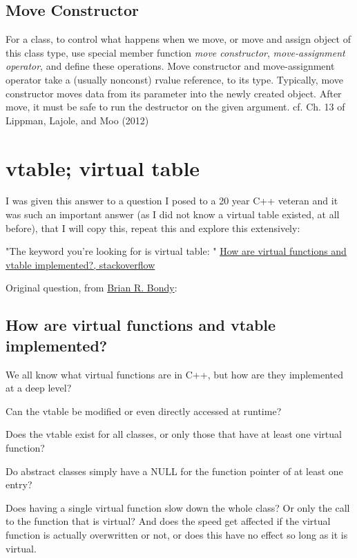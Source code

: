 \documentclass[10pt]{amsart}
\begin{document}
\begin{multicols*}{2}
\subsection{Move Constructor}  

For a class, to control what happens when we move, or move and assign object of this class type, use special member function \emph{move constructor}, \emph{move-assignment operator}, and define these operations.  Move constructor and move-assignment operator take a (usually nonconst) rvalue reference, to its type.  Typically, move constructor moves data from its parameter into the newly created object.  After move, it must be safe to run the destructor on the given argument.  cf. Ch. 13 of Lippman, Lajole, and Moo (2012) \cite{LLM2012}



\section{vtable; virtual table}  

I was given this answer to a question I posed to a 20 year C++ veteran and it was such an important answer (as I did not know a virtual table existed, at all before), that I will copy this, repeat this and explore this extensively:  

"The keyword you're looking for is virtual table: " \href{https://stackoverflow.com/questions/99297/how-are-virtual-functions-and-vtable-implemented}{How are virtual functions and vtable implemented?, stackoverflow}  

Original question, from \href{https://stackoverflow.com/users/3153/brian-r-bondy}{Brian R. Bondy}:  

\subsection{How are virtual functions and vtable implemented?}

We all know what virtual functions are in C++, but how are they implemented at a deep level?

Can the vtable be modified or even directly accessed at runtime?

Does the vtable exist for all classes, or only those that have at least one virtual function?

Do abstract classes simply have a NULL for the function pointer of at least one entry?

Does having a single virtual function slow down the whole class? Or only the call to the function that is virtual? And does the speed get affected if the virtual function is actually overwritten or not, or does this have no effect so long as it is virtual.


\end{multicols*}
\end{document}
